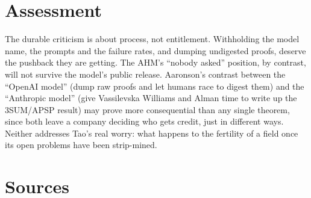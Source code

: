 \documentclass[11pt]{article}
\begin{document}
\section*{Assessment}

The durable criticism is about process, not entitlement. Withholding the model
name, the prompts and the failure rates, and dumping undigested proofs,
deserve the pushback they are getting. The AHM's ``nobody asked'' position, by
contrast, will not survive the model's public release. Aaronson's contrast
between the ``OpenAI model'' (dump raw proofs and let humans race to digest
them) and the ``Anthropic model'' (give Vassilevska Williams and Alman time to
write up the 3SUM/APSP result) may prove more consequential than any single
theorem, since both leave a company deciding who gets credit, just in
different ways. Neither addresses Tao's real worry: what happens to the
fertility of a field once its open problems have been strip-mined.

\section*{Sources}
\end{document}
